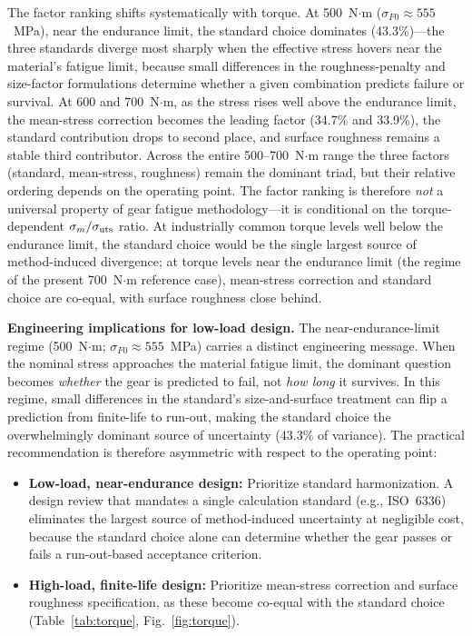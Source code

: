 \documentclass[12pt,a4paper]{article}
\begin{document}
The factor ranking shifts systematically with torque. At
500~N$\cdot$m ($\sigma_{F0} \approx 555$~MPa), near the endurance
limit, the standard choice dominates (43.3\%)---the three standards
diverge most sharply when the effective stress hovers near the
material's fatigue limit, because small differences in the
roughness-penalty and size-factor formulations determine whether a
given combination predicts failure or survival. At 600 and
700~N$\cdot$m, as the stress rises well above the endurance limit, the
mean-stress correction becomes the leading factor (34.7\% and 33.9\%),
the standard contribution drops to second place, and surface roughness
remains a stable third contributor. Across the entire 500--700~N$\cdot$m
range the three factors (standard, mean-stress, roughness) remain the
dominant triad, but their relative ordering depends on the operating
point. The factor ranking is therefore \emph{not} a universal property
of gear fatigue methodology---it is conditional on the torque-dependent
$\sigma_m/\sigma_{\rm uts}$ ratio. At industrially common torque levels
well below the endurance limit, the standard choice would be the
single largest source of method-induced divergence; at torque levels
near the endurance limit (the regime of the present 700~N$\cdot$m
reference case), mean-stress correction and standard choice are
co-equal, with surface roughness close behind.

\medskip
\noindent\textbf{Engineering implications for low-load design.}
The near-endurance-limit regime (500~N$\cdot$m; $\sigma_{F0} \approx
555$~MPa) carries a distinct engineering message. When the nominal
stress approaches the material fatigue limit, the dominant question
becomes \emph{whether} the gear is predicted to fail, not \emph{how
long} it survives. In this regime, small differences in the standard's
size-and-surface treatment can flip a prediction from finite-life to
run-out, making the standard choice the overwhelmingly dominant source
of uncertainty (43.3\% of variance). The practical recommendation is
therefore asymmetric with respect to the operating point:

\begin{itemize}
  \item \textbf{Low-load, near-endurance design:} Prioritize standard
        harmonization. A design review that mandates a single calculation
        standard (e.g., ISO~6336) eliminates the largest source of
        method-induced uncertainty at negligible cost, because the
        standard choice alone can determine whether the gear passes or
        fails a run-out-based acceptance criterion.
  \item \textbf{High-load, finite-life design:} Prioritize mean-stress
        correction and surface roughness specification, as these become
        co-equal with the standard choice (Table~\ref{tab:torque},
        Fig.~\ref{fig:torque}).
\end{itemize}
\end{document}
